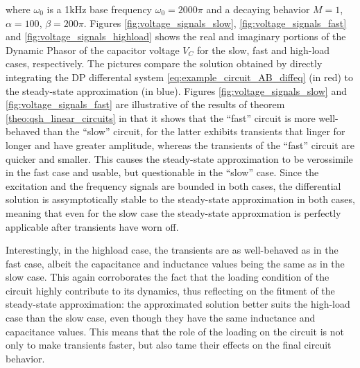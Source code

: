 \begin{example}
	\noindent where $\omega_0$ is a 1kHz base frequency $\omega_0 = 2000\pi$ and a decaying behavior $M=1$, $\alpha = 100$, $\beta = 200\pi$.
 	Figures \ref{fig:voltage_signals_slow}, \ref{fig:voltage_signals_fast} and \ref{fig:voltage_signals_highload} shows the real and imaginary portions of the Dynamic Phasor of the capacitor voltage $V_C$ for the slow, fast and high-load cases, respectively. The pictures compare the solution obtained by directly integrating the DP differental system \eqref{eq:example_circuit_AB_diffeq} (in red) to the steady-state approximation (in blue). Figures \ref{fig:voltage_signals_slow} and \ref{fig:voltage_signals_fast} are illustrative of the results of theorem \ref{theo:qsh_linear_circuits} in that it shows that the ``fast'' circuit is more well-behaved than the ``slow'' circuit, for the latter exhibits transients that linger for longer and have greater amplitude, whereas the transients of the ``fast'' circuit are quicker and smaller. This causes the steady-state approximation to be verossimile in the fast case and usable, but questionable in the ``slow'' case. Since the excitation and the frequency signals are bounded in both cases, the differential solution is assymptotically stable to the steady-state approximation in both cases, meaning that even for the slow case the steady-state approxmation is perfectly applicable after transients have worn off.

	Interestingly, in the highload case, the transients are as well-behaved as in the fast case, albeit the capacitance and inductance values being the same as in the slow case. This again corroborates the fact that the loading condition of the circuit highly contribute to its dynamics, thus reflecting on the fitment of the steady-state approximation: the approximated solution better suits the high-load case than the slow case, even though they have the same inductance and capacitance values. This means that the role of the loading on the circuit is not only to make transients faster, but also tame their effects on the final circuit behavior.


\end{example}
